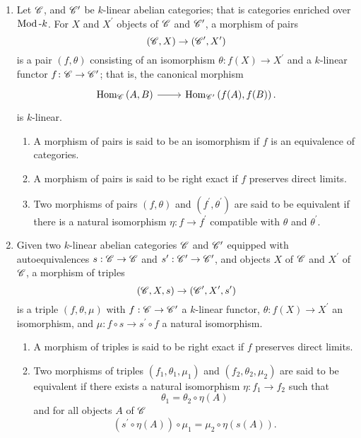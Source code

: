 \documentclass[dissertation.tex]{subfiles}
\begin{document}
\begin{defn}
  \begin{enumerate}
  \item
    Let $\mathscr{C}$, and $\mathscr{C}^\prime$ be $k$-linear abelian categories; that is categories enriched over $\operatorname{Mod}\text{-}k$.
    For $X$ and $X^\prime$ objects of $\mathscr{C}$ and $\mathscr{C}^\prime$, a morphism of pairs
    $$(\mathscr{C}, X) \rightarrow (\mathscr{C}^\prime, X^\prime)$$
    is a pair $(f, \theta)$ consisting of an isomorphism $\theta \colon f(X) \rightarrow X^\prime$ and a $k$-linear functor $f \colon \mathscr{C} \rightarrow \mathscr{C}^\prime$; that is, the canonical morphism
    $$\begin{tikzcd}
      \Hom{\CC}{A,B}\arrow{r}& \Hom{\CC^\prime}{f(A), f(B)}.
    \end{tikzcd}$$
    is $k$-linear.
    \begin{enumerate}
    \item
      A morphism of pairs is said to be an isomorphism if $f$ is an equivalence of categories.
    \item
      A morphism of pairs is said to be right exact if $f$ preserves direct limits.
    \item
      Two morphisms of pairs $(f,\theta)$ and $(f^\prime, \theta^\prime)$ are said to be equivalent if there is a natural isomorphism $\eta \colon f \rightarrow f^\prime$ compatible with $\theta$ and $\theta^\prime$.
    \end{enumerate}
  \item
    Given two $k$-linear abelian categories $\mathscr{C}$ and $\mathscr{C}^\prime$ equipped with autoequivalences $s : \mathscr{C} \rightarrow \mathscr{C}$ and $s^\prime : \mathscr{C}^\prime \rightarrow \mathscr{C}^\prime$, and objects $X$ of $\mathscr{C}$ and $X^\prime$ of $\mathscr{C}$, a morphism of triples
    $$(\mathscr{C}, X, s) \rightarrow (\mathscr{C}^\prime, X^\prime, s^\prime)$$
    is a triple $(f, \theta, \mu)$ with $f : \mathscr{C} \rightarrow \mathscr{C}^\prime$ a $k$-linear functor, $\theta : f(X) \rightarrow X^\prime$ an isomorphism, and $\mu : f \circ s \rightarrow s^\prime \circ f$ a natural isomorphism.
    \begin{enumerate}
    \item
      A morphism of triples is said to be right exact if $f$ preserves direct limits.
    \item
      Two morphisms of triples $(f_1, \theta_1, \mu_1)$ and $(f_2, \theta_2, \mu_2)$ are said to be equivalent if there exists a natural isomorphism $\eta : f_1 \rightarrow f_2$ such that
      $$\theta_1 = \theta_2 \circ \eta(A)$$
      and for all objects $A$ of $\mathscr{C}$
      $$(s^\prime \circ \eta(A)) \circ \mu_1 = \mu_2 \circ \eta(s(A)).$$

\end{enumerate}
\end{enumerate}
\end{defn}
\end{document}
